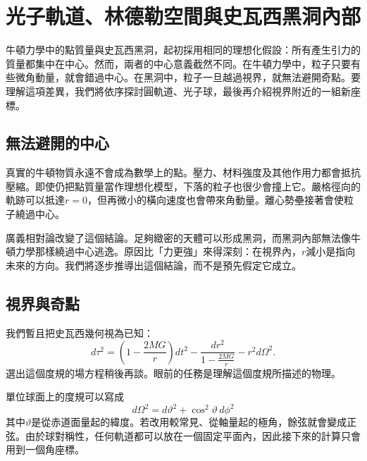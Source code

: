 \chapter{光子軌道、林德勒空間與史瓦西黑洞內部}

牛頓力學中的點質量與史瓦西黑洞，起初採用相同的理想化假設：所有產生引力的質量都集中在中心。然而，兩者的中心意義截然不同。在牛頓力學中，粒子只要有些微角動量，就會錯過中心。在黑洞中，粒子一旦越過視界，就無法避開奇點。要理解這項差異，我們將依序探討圓軌道、光子球，最後再介紹視界附近的一組新座標。

\section{無法避開的中心}

真實的牛頓物質永遠不會成為數學上的點。壓力、材料強度及其他作用力都會抵抗壓縮。即使仍把點質量當作理想化模型，下落的粒子也很少會撞上它。嚴格徑向的軌跡可以抵達\(r=0\)，但再微小的橫向速度也會帶來角動量。離心勢壘接著會使粒子繞過中心。

廣義相對論改變了這個結論。足夠緻密的天體可以形成黑洞，而黑洞內部無法像牛頓力學那樣繞過中心逃逸。原因比「力更強」來得深刻：在視界內，\(r\)減小是指向未來的方向。我們將逐步推導出這個結論，而不是預先假定它成立。

\begin{classroomqa}
\end{classroomqa}

\section{視界與奇點}

我們暫且把史瓦西幾何視為已知：
\begin{equation}
d\tau^{2}
=
\left(1-\frac{2MG}{r}\right)dt^{2}
-
\frac{dr^{2}}{1-\frac{2MG}{r}}
-
r^{2}d\Omega^{2}.
\label{eq:l6-schwarzschild}
\end{equation}
選出這個度規的場方程稍後再談。眼前的任務是理解這個度規所描述的物理。

單位球面上的度規可以寫成
\begin{equation}
d\Omega^{2}
=d\vartheta^{2}+\cos^{2}\vartheta\,d\phi^{2}
\label{eq:l6-angular-metric}
\end{equation}
其中\(\vartheta\)是從赤道面量起的緯度。若改用較常見、從軸量起的極角，餘弦就會變成正弦。由於球對稱性，任何軌道都可以放在一個固定平面內，因此接下來的計算只會用到一個角座標。

